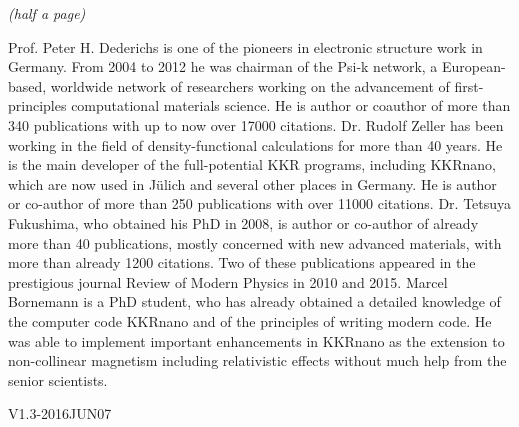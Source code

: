 \documentclass [a4paper, 12pt]{article}
\begin{document}
\textit{(half a page)}

Prof. Peter H. Dederichs is one of the pioneers in electronic structure work in Germany.
From 2004 to 2012 he was chairman of the Psi-k network, a European-based, worldwide network 
of researchers working on the advancement of first-principles computational materials science.
He is author or coauthor of more than 340 publications with up to now over 17000 citations.
Dr. Rudolf Zeller has been working in the field of density-functional calculations for more than 40 years. 
He is the main developer of the full-potential KKR programs, including KKRnano, 
which are now used in J{\"u}lich and several other places in Germany. He is author or co-author of more 
than 250 publications with over 11000 citations. Dr. Tetsuya Fukushima, who obtained his PhD in 2008,
is author or co-author of already more than 40 publications, mostly concerned with new advanced materials, 
with more than already 1200 citations. Two of these publications appeared in the prestigious 
journal Review of Modern Physics in 2010 and 2015. Marcel Bornemann is a PhD student, who has already
obtained a detailed knowledge of the computer code KKRnano and of the principles of writing modern code. 
He was able to implement important enhancements in KKRnano as the extension to non-collinear
magnetism including relativistic effects without much help from the senior scientists.
\newpage




\bigskip
\begin{flushright}
{\tiny V1.3-2016JUN07}
\end{flushright}
\end{document}
